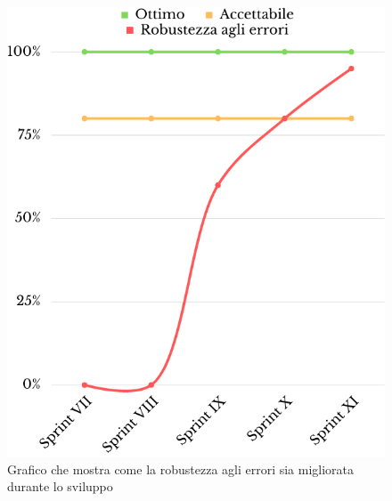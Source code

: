 \begin{figure}[H]
	\centering
	\includegraphics[scale=0.35]{img/robustezz_errori.png}
	\caption{Grafico che mostra come la robustezza agli errori sia migliorata durante lo sviluppo}
\end{figure}
